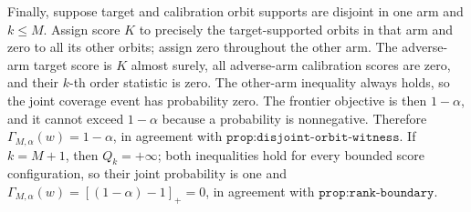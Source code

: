 Finally, suppose target and calibration orbit supports are disjoint in one arm and \(k\le M\). Assign score \(K\) to precisely the target-supported orbits in that arm and zero to all its other orbits; assign zero throughout the other arm. The adverse-arm target score is \(K\) almost surely, all adverse-arm calibration scores are zero, and their \(k\)-th order statistic is zero. The other-arm inequality always holds, so the joint coverage event has probability zero. The frontier objective is then \(1-\alpha\), and it cannot exceed \(1-\alpha\) because a probability is nonnegative. Therefore \(\Gamma_{M,\alpha}(w)=1-\alpha\), in agreement with \(\texttt{prop:disjoint-orbit-witness}\). If \(k=M+1\), then \(Q_k=+\infty\); both inequalities hold for every bounded score configuration, so their joint probability is one and \(\Gamma_{M,\alpha}(w)=[(1-\alpha)-1]_+=0\), in agreement with \(\texttt{prop:rank-boundary}\).